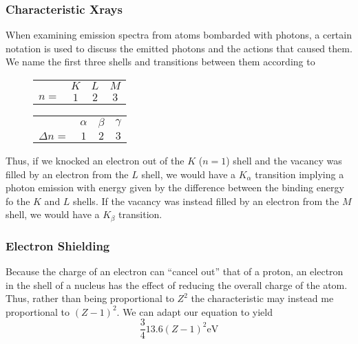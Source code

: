 \documentclass[12pt]{report}
\begin{document}
\begin{flushleft}
\subsubsection*{Characteristic Xrays}

When examining emission spectra from atoms bombarded with photons, a certain
notation is used to discuss the emitted photons and the actions that caused
them. We name the first three shells and transitions between them according to

\begin{figure}[!htb]
    \hspace{0.05\textwidth}
    \begin{minipage}{0.4\textwidth}
        \centering
        \begin{tabular}{c|c|c|c|}
            & \(K\) & \(L\) & \(M\) \\
            \(n = \) & \(1\) & \(2\) & \(3\) \\
        \end{tabular}
    \end{minipage}
    \begin{minipage}{0.4\textwidth}
        \centering
        \begin{tabular}{c|c|c|c|}
            & \(\alpha\) & \(\beta\) & \(\gamma\) \\
            \(\Delta n =\) & \(1\) & \(2\) & \(3\) \\
        \end{tabular}
    \end{minipage}
\end{figure}

Thus, if we knocked an electron out of the \(K\) (\(n = 1\)) shell and the
vacancy was filled by an electron from the \(L\) shell, we would have a
\(K_\alpha\) transition implying a photon emission with energy given by the
difference between the binding energy fo the \(K\) and \(L\) shells. If the
vacancy was instead filled by an electron from the \(M\) shell, we would have
a \(K_\beta\) transition.

\subsubsection*{Electron Shielding}

Because the charge of an electron can ``cancel out'' that of a proton, an
electron in the shell of a nucleus has the effect of reducing the overall
charge of the atom. Thus, rather than being proportional to \(Z^2\) the
characteristic may instead me proportional to \((Z - 1)^2\). We can adapt
our equation to yield
\[\frac{3}{4}13.6(Z - 1)^2\mathrm{eV}\]


\end{flushleft}
\end{document}
